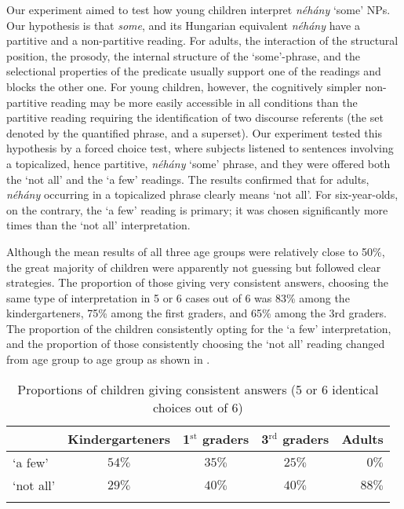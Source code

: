 \documentclass[output=paper]{langscibook}
\begin{document}
Our experiment aimed to test how young children interpret \textit{néhány} `some' NPs. Our hypothesis is that \textit{some}, and its Hungarian equivalent \textit{néhány} have a partitive and a non-partitive reading. For adults, the interaction of the structural position, the prosody, the internal structure of the `some'-phrase, and the selectional properties of the predicate usually support one of the readings and blocks the other one. For young children, however, the cognitively simpler non-partitive reading may be more easily accessible in all conditions than the partitive reading requiring the identification of two discourse referents (the set denoted by the quantified phrase, and a superset).	Our experiment tested this hypothesis by a forced choice test, where subjects listened to sentences involving a topicalized, hence partitive, \textit{néhány} `some' phrase, and they were offered both the `not all' and the `a few' readings. The results confirmed that for adults, \textit{néhány} occurring in a topicalized phrase clearly means `not all'. For six-year-olds, on the contrary, the `a few' reading is primary; it was chosen significantly more times than the `not all' interpretation. 

Although the mean results of all three age groups were relatively close to 50\%, the great majority of children were apparently not guessing but followed clear strategies. The proportion of those giving very consistent answers, choosing the same type of interpretation in 5 or 6 cases out of 6 was 83\% among the kindergarteners, 75\% among the first graders, and 65\% among the 3rd graders. The proportion of the children consistently opting for the `a few' interpretation, and the proportion of those consistently choosing the `not all' reading changed from age group to age group as shown in .

\begin{table}
\begin{tabular}{l c c c r} 
\lsptoprule
 {} & Kindergarteners & 1$^\text{st}$ graders & 3$^\text{rd}$ graders & \multicolumn{1}{c}{Adults}\\
\midrule
`a few' & $54\%$ & $35\%$ & $25\%$ & $0\%$ \\
`not all' & $29\%$ & $40\%$ & $40\%$ & $88\%$ \\
\lspbottomrule
\end{tabular}
\caption{Proportions of children giving consistent answers (5 or 6 identical choices out of 6)}
\label{kis-zet:table:1}
\end{table}
\end{document}

